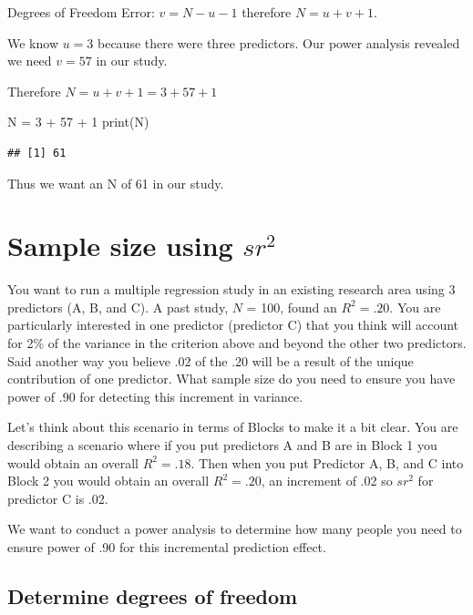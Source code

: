 \documentclass[
]{krantz}
\makeatletter
\newenvironment{Shaded}{\begin{snugshade}}{\end{snugshade}}
\newcommand{\DecValTok}[1]{\textcolor[rgb]{0.06,0.06,0.06}{#1}}
\newcommand{\FunctionTok}[1]{\textcolor[rgb]{0,0,0}{#1}}
\newcommand{\NormalTok}[1]{#1}
\newcommand{\OtherTok}[1]{\textcolor[rgb]{0.37,0.37,0.37}{#1}}
\newcommand{\SpecialCharTok}[1]{\textcolor[rgb]{0,0,0}{#1}}
\newenvironment{kframe}{%
\medskip{}
\setlength{\fboxsep}{.8em}
 \def\at@end@of@kframe{}%
 \ifinner\ifhmode%
  \def\at@end@of@kframe{\end{minipage}}%
  \begin{minipage}{\columnwidth}%
 \fi\fi%
 \def\FrameCommand##1{\hskip\@totalleftmargin \hskip-\fboxsep
 \colorbox{shadecolor}{##1}\hskip-\fboxsep
     \hskip-\linewidth \hskip-\@totalleftmargin \hskip\columnwidth}%
 \MakeFramed {\advance\hsize-\width
   \@totalleftmargin\z@ \linewidth\hsize
   \@setminipage}}%
 {\par\unskip\endMakeFramed%
 \at@end@of@kframe}
\renewenvironment{Shaded}{\begin{kframe}}{\end{kframe}}
\makeatother
\begin{document}
Degrees of Freedom Error: \(v = N - u - 1\) therefore \(N = u + v + 1\).

We know \(u = 3\) because there were three predictors. Our power analysis revealed we need \(v = 57\) in our study.

Therefore \(N = u + v + 1 = 3 + 57 + 1\)

\begin{Shaded}
\begin{Highlighting}[]
\NormalTok{N }\OtherTok{=} \DecValTok{3} \SpecialCharTok{+} \DecValTok{57} \SpecialCharTok{+} \DecValTok{1}
\FunctionTok{print}\NormalTok{(N)}
\end{Highlighting}
\end{Shaded}

\begin{verbatim}
## [1] 61
\end{verbatim}

Thus we want an N of 61 in our study.

\hypertarget{sample-size-using-sr2}{%
\section{\texorpdfstring{Sample size using \(sr^2\)}{Sample size using sr\^{}2}}\label{sample-size-using-sr2}}

You want to run a multiple regression study in an existing research area using 3 predictors (A, B, and C). A past study, \(N\) = 100, found an \(R^2=.20\). You are particularly interested in one predictor (predictor C) that you think will account for 2\% of the variance in the criterion above and beyond the other two predictors. Said another way you believe .02 of the .20 will be a result of the unique contribution of one predictor. What sample size do you need to ensure you have power of .90 for detecting this increment in variance.

Let's think about this scenario in terms of Blocks to make it a bit clear. You are describing a scenario where if you put predictors A and B are in Block 1 you would obtain an overall \(R^2 = .18\). Then when you put Predictor A, B, and C into Block 2 you would obtain an overall \(R^2 = .20\), an increment of .02 so \(sr^2\) for predictor C is .02.

We want to conduct a power analysis to determine how many people you need to ensure power of .90 for this incremental prediction effect.

\hypertarget{determine-degrees-of-freedom-1}{%
\subsection{Determine degrees of freedom}\label{determine-degrees-of-freedom-1}}
\end{document}
